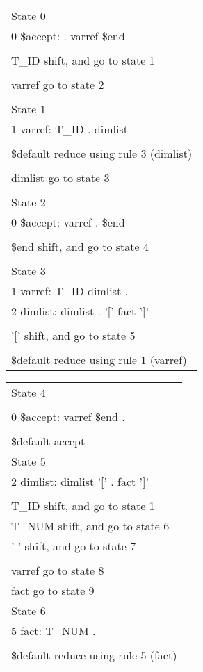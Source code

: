 \begin{minipage}{\linewidth}
\begin{footnotesize}
\begin{minipage}[c]{0.31\linewidth}
\begin{tabular}{|l|}
\hline
State 0\\
0 \$accept: . varref \$end\\
\\
T\_ID  shift, and go to state 1\\
\\
varref  go to state 2\\
\\
\hline
State 1\\
1 varref: T\_ID . dimlist\\
\\
\$default  reduce using rule 3 (dimlist)\\
\\
dimlist  go to state 3\\
\\
\hline
State 2\\
0 \$accept: varref . \$end\\
\\
\$end  shift, and go to state 4\\
\\
\hline
State 3\\
1 varref: T\_ID dimlist .\\
2 dimlist: dimlist . '[' fact ']'\\
\\
'['  shift, and go to state 5\\
\\
\$default  reduce using rule 1 (varref)\\
\hline
\end{tabular}

\end{minipage}%
\begin{minipage}[c]{0.31\linewidth}
\begin{tabular}{|l|}
\hline
State 4\\
\\
    0 \$accept: varref \$end .\\
\\
    \$default  accept\\
\hline
State 5\\
    2 dimlist: dimlist '[' . fact ']'\\
\\
    T\_ID   shift, and go to state 1\\
    T\_NUM  shift, and go to state 6\\
    '-'    shift, and go to state 7\\
\\
    varref  go to state 8\\
    fact    go to state 9\\
\hline
State 6
\\
    5 fact: T\_NUM .\\
\\
    \$default  reduce using rule 5 (fact)\\
\hline
\end{tabular}



\end{minipage}
\end{footnotesize}
\end{minipage}
